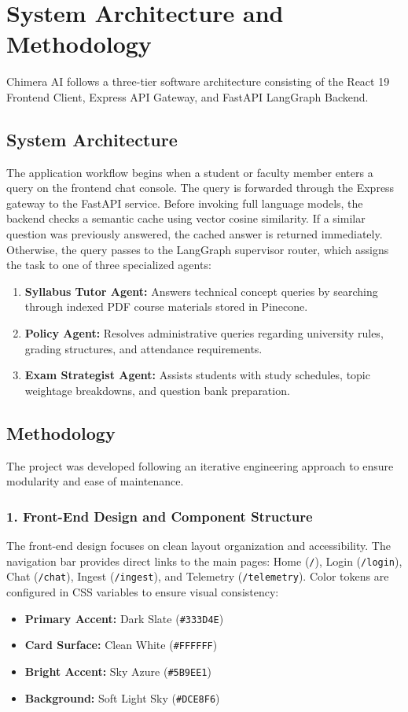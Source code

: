 \chapter{System Architecture and Methodology}

Chimera AI follows a three-tier software architecture consisting of the React 19 Frontend Client, Express API Gateway, and FastAPI LangGraph Backend. 

\section{System Architecture}
The application workflow begins when a student or faculty member enters a query on the frontend chat console. The query is forwarded through the Express gateway to the FastAPI service. Before invoking full language models, the backend checks a semantic cache using vector cosine similarity. If a similar question was previously answered, the cached answer is returned immediately. Otherwise, the query passes to the LangGraph supervisor router, which assigns the task to one of three specialized agents:
\begin{enumerate}
    \item \textbf{Syllabus Tutor Agent:} Answers technical concept queries by searching through indexed PDF course materials stored in Pinecone.
    \item \textbf{Policy Agent:} Resolves administrative queries regarding university rules, grading structures, and attendance requirements.
    \item \textbf{Exam Strategist Agent:} Assists students with study schedules, topic weightage breakdowns, and question bank preparation.
\end{enumerate}

\section{Methodology}
The project was developed following an iterative engineering approach to ensure modularity and ease of maintenance.

\subsection{1. Front-End Design and Component Structure}
The front-end design focuses on clean layout organization and accessibility. The navigation bar provides direct links to the main pages: Home (\texttt{/}), Login (\texttt{/login}), Chat (\texttt{/chat}), Ingest (\texttt{/ingest}), and Telemetry (\texttt{/telemetry}). Color tokens are configured in CSS variables to ensure visual consistency:
\begin{itemize}
    \item \textbf{Primary Accent:} Dark Slate (\texttt{\#333D4E})
    \item \textbf{Card Surface:} Clean White (\texttt{\#FFFFFF})
    \item \textbf{Bright Accent:} Sky Azure (\texttt{\#5B9EE1})
    \item \textbf{Background:} Soft Light Sky (\texttt{\#DCE8F6})
\end{itemize}


